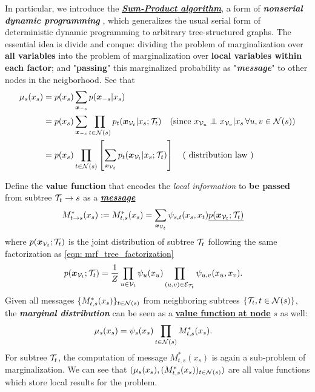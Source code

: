 \documentclass[11pt]{article}
\begin{document}

In particular, we introduce the \underline{\textbf{\emph{Sum-Product algorithm}}}, a form of \emph{\textbf{nonserial dynamic programming}} \citep{bertele1973non}, which generalizes the usual serial form of deterministic dynamic programming \citep{bertsekas2012dynamic} to arbitrary tree-structured graphs. The essential idea is divide and conque: dividing the problem of marginalization over \textbf{all variables} into the problem of marginalization over \textbf{local variables within each factor}; and 
"\textbf{passing}" this marginalized probability as "\textbf{\emph{message}}" to other nodes in the neigborhood.  See that
\begin{align}
\mu_{s}(x_{s}) &= p(x_s)\sum_{\mb{x}_{-s}}p(\mb{x}_{-s}|x_s)  \nonumber\\
&= p(x_s)\sum_{\mb{x}_{-s}}\prod_{t\in \cN(s)}p_{t}(\mb{x}_{\cV_{t}}|x_s; \cT_{t})\quad (\text{since }x_{\cV_{u}} \indep x_{\cV_{v}} | x_s\, \forall u,v \in \cN(s)) \nonumber\\
&= p(x_s)\prod_{t\in \cN(s)}\brac{\sum_{\mb{x}_{\cV_{t}}}p_{t}(\mb{x}_{\cV_{t}}|x_s; \cT_{t})}\quad (\text{ distribution law }) \nonumber
\end{align}

Define the \textbf{value function} that encodes the \emph{local information} to \textbf{be passed} from subtree ${\mathcal T}_{t} \rightarrow s$ as a \underline{\textbf{\emph{message}}}
\begin{align}
M_{t \rightarrow s}^{*}(x_s) := M_{t,s}^{*}(x_s) &= \sum_{\boldsymbol{x}_{{\mathcal V}_t}}\psi_{s,t}(x_s, x_t)\underline{p(\boldsymbol{x}_{{\mathcal V}_t}; {\mathcal T}_{t})} \label{eqn: mrf_tree_sum_product_message} 
\end{align} where $p(\boldsymbol{x}_{{\mathcal V}_t}; {\mathcal T}_{t})$ is the joint distribution of subtree ${\mathcal T}_t$ following the same factorization as \eqref{eqn: mrf_tree_factorization}
\begin{align*}
p(\boldsymbol{x}_{{\mathcal V}_t}; {\mathcal T}_{t}) &=  \frac{1}{Z}\prod_{u\in {\mathcal V}_t}\psi_{u}(x_{u})\prod_{(u,v) \in {\mathcal E}_{{\mathcal T}_t}}\psi_{u,v}(x_{u}, x_{v}).
\end{align*}  Given all messages $\{ M_{t,s}^{*}(x_s) \}_{t\in {\mathcal N}(s)}$ from neighboring subtrees $\{{\mathcal T}_t, t \in {\mathcal N}(s)\}$, the \textbf{\emph{marginal distribution}} can be seen as a \underline{\textbf{value function} \textbf{at node}} $s$ as well: 
\begin{align}
\mu_{s}(x_{s}) &=\psi_{s}(x_s)\prod_{t \in {\mathcal N}(s)}M_{t,s}^{*}(x_s). \label{eqn: mrf_tree_sum_product_marginal} 
\end{align} For subtree ${\mathcal T}_t$, the computation of message $M_{t,s}^{*}(x_s)$ is again a sub-problem of marginalization. We can see that $(\mu_{s}(x_{s}),  (M_{t,s}^{*}(x_s))_{t \in {\mathcal N}(s)})$ are all value functions which store local results for the problem.
\end{document}
